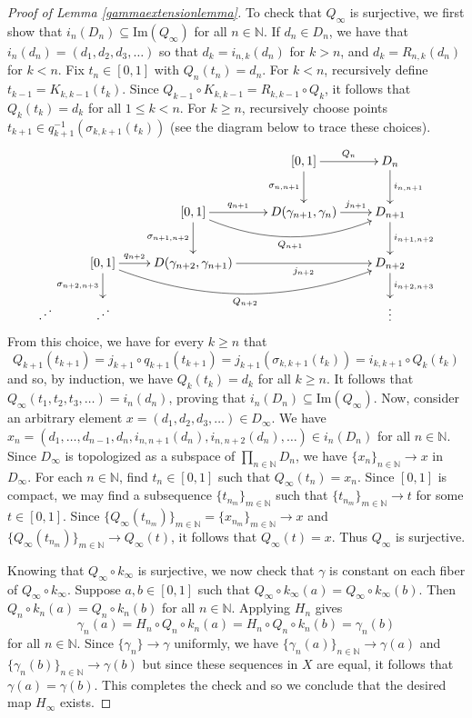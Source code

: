 \documentclass[12pt, leqno]{amsart}
\newcommand{\im}{\text{Im}}
\newcommand{\ui}{[0,1]}
\newcommand{\bbn}{\mathbb{N}}
\theoremstyle{definition}\newtheorem{definition}[theorem]{Definition}
\begin{document}
\begin{proof}[Proof of Lemma \ref{gammaextensionlemma}]
To check that $Q_{\infty}$ is surjective, we first show that $i_n(D_n)\subseteq \im(Q_{\infty})$ for all $n\in\bbn$. If $d_n\in D_n$, we have that $i_n(d_n)=(d_1,d_2,d_3,\dots)$ so that $d_k=i_{n,k}(d_n)$ for $k>n$, and $d_k=R_{n,k}(d_n)$ for $k<n$. Fix $t_n\in \ui$ with $Q_n(t_n)=d_n$. For $k<n$, recursively define $t_{k-1}=K_{k,k-1}(t_k)$. Since $Q_{k-1}\circ K_{k,k-1}=R_{k,k-1}\circ Q_k$, it follows that $Q_k(t_k)=d_k$ for all $1\leq k<n$. For $k\geq n$, recursively choose points $t_{k+1}\in q_{k+1}^{-1}(\sigma_{k,k+1}(t_k))$ (see the diagram below to trace these choices).
\[\xymatrix{
&&& \ui \ar[d]_{\sigma_{n,n+1}} \ar[r]^-{Q_n} & D_n \ar[d]^-{i_{n,n+1}} \\
&& \ui \ar@/_1.6pc/[rr]_-{Q_{n+1}} \ar[d]_{\sigma_{n+1,n+2}} \ar[r]^-{q_{n+1}} & D(\gamma_{n+1},\gamma_n) \ar[r]^-{j_{n+1}} & D_{n+1} \ar[d]^-{i_{n+1,n+2}}\\
& \ui \ar@/_2pc/[rrr]_-{Q_{n+2}} \ar[d]_-{\sigma_{n+2,n+3}} \ar[r]^-{q_{n+2}} & D(\gamma_{n+2},\gamma_{n+1}) \ar[rr]_-{j_{n+2}} && D_{n+2} \ar[d]^-{i_{n+2,n+3}}\\
\iddots & \iddots &&& \vdots
}\]
From this choice, we have for every $k\geq n$ that \[Q_{k+1}(t_{k+1})=j_{k+1}\circ q_{k+1}(t_{k+1})=j_{k+1}(\sigma_{k,k+1}(t_k))=i_{k,k+1}\circ Q_{k}(t_k)\] and so, by induction, we have $Q_k(t_k)=d_k$ for all $k\geq n$. It follows that $Q_{\infty}(t_1,t_2,t_3,\dots)=i_n(d_n)$, proving that $i_n(D_n)\subseteq \im(Q_{\infty})$. Now, consider an arbitrary element $x=(d_1,d_2,d_3,\dots)\in D_{\infty}$. We have $x_n=(d_1,\dots,d_{n-1},d_n,i_{n,n+1}(d_n),i_{n,n+2}(d_n),\dots)\in i_n(D_n)$ for all $n\in\bbn$. Since $D_{\infty}$ is topologized as a subspace of $\prod_{n\in\bbn}D_n$, we have $\{x_n\}_{n\in\bbn}\to x$ in $D_{\infty}$. For each $n\in\bbn$, find $t_n\in\ui$ such that $Q_{\infty}(t_n)=x_n$. Since $\ui$ is compact, we may find a subsequence $\{t_{n_m}\}_{m\in\bbn}$ such that $\{t_{n_m}\}_{m\in\bbn}\to t$ for some $t\in\ui$. Since $\{Q_{\infty}(t_{n_m})\}_{m\in\bbn}=\{x_{n_m}\}_{m\in\bbn}\to x$ and $\{Q_{\infty}(t_{n_m})\}_{m\in\bbn}\to Q_{\infty}(t)$, it follows that $Q_{\infty}(t)=x$. Thus $Q_{\infty}$ is surjective.

Knowing that $Q_{\infty}\circ k_{\infty}$ is surjective, we now check that $\gamma$ is constant on each fiber of $Q_{\infty}\circ k_{\infty}$. Suppose $a,b\in\ui$ such that $Q_{\infty}\circ k_{\infty}(a)=Q_{\infty}\circ k_{\infty}(b)$. Then $Q_{n}\circ k_{n}(a)=Q_{n}\circ k_{n}(b)$ for all $n\in\bbn$. Applying $H_n$ gives
\[\gamma_n(a)=H_n\circ Q_{n}\circ k_{n}(a)=H_n\circ Q_{n}\circ k_{n}(b)=\gamma_n(b)\]
for all $n\in\bbn$. Since $\{\gamma_n\}\to\gamma$ uniformly, we have $\{\gamma_n(a)\}_{n\in\bbn}\to\gamma(a)$ and $\{\gamma_n(b)\}_{n\in\bbn}\to\gamma(b)$ but since these sequences in $X$ are equal, it follows that $\gamma(a)=\gamma(b)$. This completes the check and so we conclude that the desired map $H_{\infty}$ exists.


\end{proof}
\end{document}
